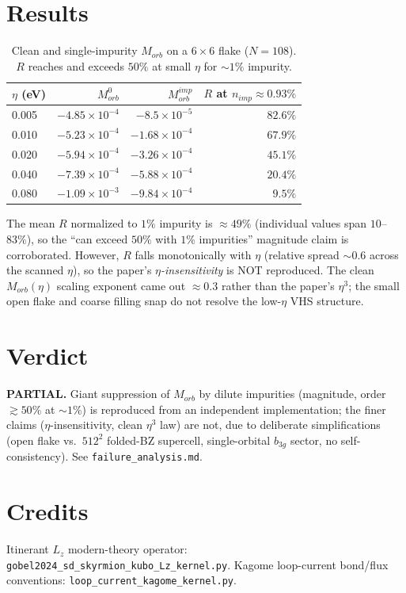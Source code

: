 \documentclass[11pt]{article}
\begin{document}
\section{Results}
\begin{table}[h]\centering
\begin{tabular}{lrrr}
\toprule
$\eta$ (eV) & $M_{orb}^0$ & $M_{orb}^{imp}$ & $R$ at $n_{imp}\!\approx\!0.93\%$ \\
\midrule
0.005 & $-4.85\times10^{-4}$ & $-8.5\times10^{-5}$ & $82.6\%$ \\
0.010 & $-5.23\times10^{-4}$ & $-1.68\times10^{-4}$ & $67.9\%$ \\
0.020 & $-5.94\times10^{-4}$ & $-3.26\times10^{-4}$ & $45.1\%$ \\
0.040 & $-7.39\times10^{-4}$ & $-5.88\times10^{-4}$ & $20.4\%$ \\
0.080 & $-1.09\times10^{-3}$ & $-9.84\times10^{-4}$ & $9.5\%$ \\
\bottomrule
\end{tabular}
\caption{Clean and single-impurity $M_{orb}$ on a $6\times6$ flake ($N=108$).
$R$ reaches and exceeds $50\%$ at small $\eta$ for $\sim1\%$ impurity.}
\end{table}

The mean $R$ normalized to $1\%$ impurity is $\approx 49\%$ (individual values
span $10$--$83\%$), so the ``can exceed $50\%$ with $1\%$ impurities'' magnitude
claim is corroborated. However, $R$ falls monotonically with $\eta$
(relative spread $\sim0.6$ across the scanned $\eta$), so the paper's
\emph{$\eta$-insensitivity} is NOT reproduced. The clean $M_{orb}(\eta)$ scaling
exponent came out $\approx0.3$ rather than the paper's $\eta^3$; the small open
flake and coarse filling snap do not resolve the low-$\eta$ VHS structure.

\section{Verdict}
\textbf{PARTIAL.} Giant suppression of $M_{orb}$ by dilute impurities
(magnitude, order $\gtrsim50\%$ at $\sim1\%$) is reproduced from an independent
implementation; the finer claims ($\eta$-insensitivity, clean $\eta^3$ law) are
not, due to deliberate simplifications (open flake vs.\ $512^2$ folded-BZ
supercell, single-orbital $b_{3g}$ sector, no self-consistency). See
\texttt{failure\_analysis.md}.

\section*{Credits}
Itinerant $L_z$ modern-theory operator: \texttt{gobel2024\_sd\_skyrmion\_kubo\_Lz\_kernel.py}.
Kagome loop-current bond/flux conventions: \texttt{loop\_current\_kagome\_kernel.py}.
\end{document}

